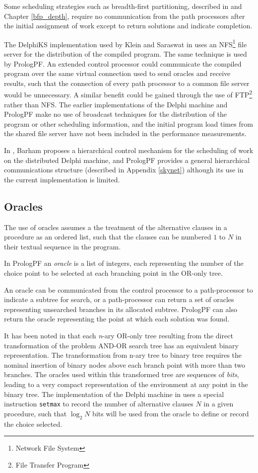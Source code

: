 Some scheduling strategies such as breadth-first partitioning, described in \cite{Sar95} 
and Chapter \ref{bfp_depth}, require no communication from the path processors after the
initial assignment of work except to return solutions and indicate completion.

The DelphiKS implementation used by Klein and Saraswat
in \cite{Kle91,Sar95} uses an NFS\footnote{Network File System} file
server for the distribution of the compiled program.  The same technique is used by PrologPF.
An extended control processor could communicate the compiled program over the same
virtual connection used to send oracles and receive results, such that the connection of
every path processor to a common file server would be unnecessary.  A similar benefit could
be gained through the use of FTP\footnote{File Transfer Program} rather than NFS.
The earlier implementations of the Delphi machine and PrologPF make no use of broadcast
techniques for the distribution of the program or other scheduling information, and
the initial program load times from the shared file server have not been included in the
performance measurements.

In \cite{Bar92}, Barham proposes a hierarchical control mechanism for the scheduling of work on
the distributed Delphi machine, and PrologPF provides a general hierarchical communications
structure (described in Appendix \ref{skynet})
although its use in the current implementation is
limited.

\subsection{Oracles}

The use of oracles assumes a the treatment of the alternative clauses in a procedure
as an ordered list, such that the clauses can be numbered $1$ to $N$ in their
textual sequence in the program.

In PrologPF an \textit{oracle}
is a list of integers, each representing the number of the choice
point to be selected at each branching point in the OR-only tree. 

An oracle can be communicated from the control processor to a path-processor to
indicate a subtree for search, or a path-processor can return a set of oracles representing
unsearched branches in its allocated subtree.  PrologPF can also return the oracle representing
the point at which each solution was found.

It has been noted in
\cite{CA87,Kle91} that each \textit{n}-ary OR-only tree resulting from the direct
transformation of the problem AND-OR search tree has an equivalent binary representation.
The transformation from n-ary tree to binary tree requires the nominal insertion
of binary nodes above each branch point with more than two branches.  The oracles used
within this transformed tree are sequences of \textit{bits}, leading to a very compact
representation of the environment at any point in the binary tree.  The implementation of
the Delphi machine in \cite{Kle91} uses a special instruction \texttt{setmax} to record
the number of alternative clauses $N$ in a given procedure, such that $\log _2 N$ bits will
be used from the oracle to define or record the choice selected.

